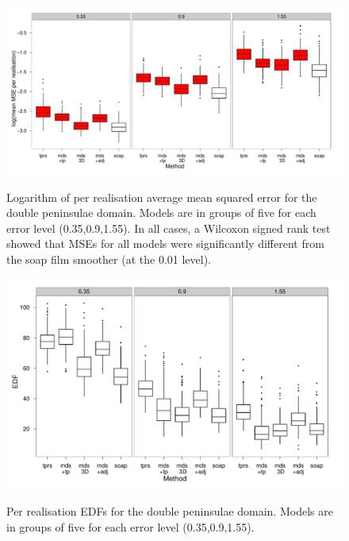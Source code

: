 \begin{figure}
\centering
\includegraphics[width=\textwidth]{mds/figs/big-mds-wt2-boxplot.pdf} \\
\caption{Logarithm of per realisation average mean squared error for the double peninsulae domain. Models are in groups of five for each error level (0.35,0.9,1.55). In all cases, a Wilcoxon signed rank test showed that MSEs for all models were significantly different from the soap film smoother (at the 0.01 level).}
\label{big-wt2-mses}
\end{figure}

\begin{figure}
\centering
\includegraphics[width=\textwidth]{mds/figs/big-mds-wt2-boxplot-edf.pdf} \\
\caption{Per realisation EDFs for the double peninsulae domain. Models are in groups of five for each error level (0.35,0.9,1.55).}
\label{big-wt2-edfs}
\end{figure}

